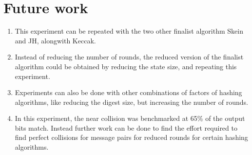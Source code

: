 \section{Future work}

\begin{enumerate}
\item This experiment can be repeated with the two other finalist algorithm Skein and JH, alongwith Keccak.
\item Instead of reducing the number of rounds, the reduced version of the finalist algorithm could be obtained
by reducing the state size, and repeating this experiment.
\item Experiments can also be done with other combinations of factors of hashing algorithms, like reducing the
digest size, but increasing the number of rounds.
\item In this experiment, the near collision was benchmarked at 65\% of the output bits match. Instead further work
can be done to find the effort required to find perfect collisions for message pairs for reduced rounds for
certain hashing algorithms.
\end{enumerate}
